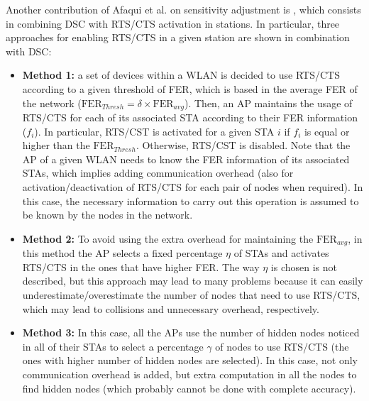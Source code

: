\documentclass[12pt, a4paper,twoside]{tesi_upf}
\begin{document}
			Another contribution of Afaqui et al. on sensitivity adjustment is \cite{afaqui2016rtscts}, which consists in combining DSC with RTS/CTS activation in stations. In particular, three approaches for enabling RTS/CTS in a given station are shown in combination with DSC:	
			\begin{itemize}
				\item \textbf{Method 1:} a set of devices within a WLAN is decided to use RTS/CTS according to a given threshold of FER, which is based in the average FER of the network ($\mathrm{FER}_{Thresh} = \delta \times \mathrm{FER}_{avg}$). Then, an AP maintains the usage of RTS/CTS for each of its associated STA according to their FER information ($f_i$). In particular, RTS/CST is activated for a given STA $i$ if $f_i$ is equal or higher than the $\mathrm{FER}_{Thresh}$. Otherwise, RTS/CST is disabled. 
				Note that the AP of a given WLAN needs to know the FER information of its associated STAs, which implies adding communication overhead (also for activation/deactivation of RTS/CTS for each pair of nodes when required). In this case, the necessary information to carry out this operation is assumed to be known by the nodes in the network.
				\item \textbf{Method 2:} To avoid using the extra overhead for maintaining the $\mathrm{FER}_{avg}$, in this method the AP selects a fixed percentage $\eta$ of STAs and activates RTS/CTS in the ones that have higher FER. The way $\eta$ is chosen is not described, but this approach may lead to many problems because it can easily underestimate/overestimate the number of nodes that need to use RTS/CTS, which may lead to collisions and unnecessary overhead, respectively. 
				\item \textbf{Method 3:} In this case, all the APs use the number of hidden nodes noticed in all of their STAs to select a percentage $\gamma$ of nodes to use RTS/CTS (the ones with higher number of hidden nodes are selected). In this case, not only communication overhead is added, but extra computation in all the nodes to find hidden nodes (which probably cannot be done with complete accuracy).
			\end{itemize}
			
\end{document}
